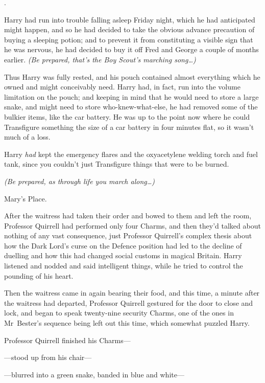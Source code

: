 
.

\hplettrineextrapara
Harry had run into trouble falling asleep Friday night, which he had anticipated might happen, and so he had decided to take the obvious advance precaution of buying a sleeping potion; and to prevent it from constituting a visible sign that he was nervous, he had decided to buy it off Fred and George a couple of months earlier. \emph{(Be prepared, that’s the Boy Scout’s marching song…)}

Thus Harry was fully rested, and his pouch contained almost everything which he owned and might conceivably need. Harry had, in fact, run into the volume limitation on the pouch; and keeping in mind that he would need to store a large snake, and might need to store who-knew-what-else, he had removed some of the bulkier items, like the car battery. He was up to the point now where he could Transfigure something the size of a car battery in four minutes flat, so it wasn’t much of a loss.

Harry \emph{had} kept the emergency flares and the oxyacetylene welding torch and fuel tank, since you couldn’t just Transfigure things that were to be burned.

\emph{(Be prepared, as through life you march along…)}

Mary’s Place.

After the waitress had taken their order and bowed to them and left the room, Professor Quirrell had performed only four Charms, and then they’d talked about nothing of any vast consequence, just Professor Quirrell’s complex thesis about how the Dark Lord’s curse on the Defence position had led to the decline of duelling and how this had changed social customs in magical Britain. Harry listened and nodded and said intelligent things, while he tried to control the pounding of his heart.

Then the waitress came in again bearing their food, and this time, a minute after the waitress had departed, Professor Quirrell gestured for the door to close and lock, and began to speak twenty-nine security Charms, one of the ones in Mr~Bester’s sequence being left out this time, which somewhat puzzled Harry.

Professor Quirrell finished his Charms—

—stood up from his chair—

—blurred into a green snake, banded in blue and white—

